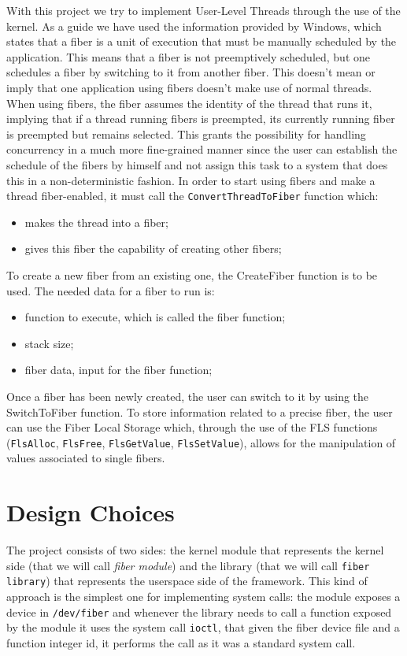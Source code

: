 \documentclass[a4paper,10pt]{article}
\begin{document}
 With this project we try to implement User-Level Threads through the use of the kernel. As a guide we have used the information provided by Windows, which states that a fiber is a unit of execution that must be manually scheduled by the application. This means that a fiber is not preemptively scheduled, but one schedules a fiber by switching to it from another fiber. This doesn’t mean or imply that one application using fibers doesn’t make use of normal threads. When using fibers, the fiber assumes the identity of the thread that runs it, implying that if a thread running fibers is preempted, its currently running fiber is preempted but remains selected. This grants the possibility for handling concurrency in a much more fine-grained manner since the user can establish the schedule of the fibers by himself and not assign this task to a system that does this in a non-deterministic fashion.
 In order to start using fibers and make a thread fiber-enabled, it must call the \lstinline{ConvertThreadToFiber} function which:
 \begin{itemize}
   \item makes the thread into a fiber;
   \item gives this fiber the capability of creating other fibers;
 \end{itemize}
 To create a new fiber from an existing one, the CreateFiber function is to be used. The needed data for a fiber to run is:
 \begin{itemize}
   \item function to execute, which is called the fiber function;
   \item stack size;
   \item fiber data, input for the fiber function;
 \end{itemize}

 Once a fiber has been newly created, the user can switch to it by using the SwitchToFiber function.
 To store information related to a precise fiber, the user can use the Fiber Local Storage which, through the use of the FLS functions (\lstinline{FlsAlloc}, \lstinline{FlsFree}, \lstinline{FlsGetValue}, \lstinline{FlsSetValue}), allows for the manipulation of values associated to single fibers.

\section{Design Choices}
 The project consists of two sides: the kernel module that represents the kernel side (that we will call \textit{fiber module}) and the library (that we will call \texttt{fiber library}) that represents the userspace side of the framework. This kind of approach is the simplest one for implementing system calls: the module exposes a device in \lstinline{/dev/fiber} and whenever the library needs to call a function exposed by the module it uses the system call \lstinline{ioctl}, that given the fiber device file and a function integer id, it performs the call as it was a standard system call.
\end{document}
